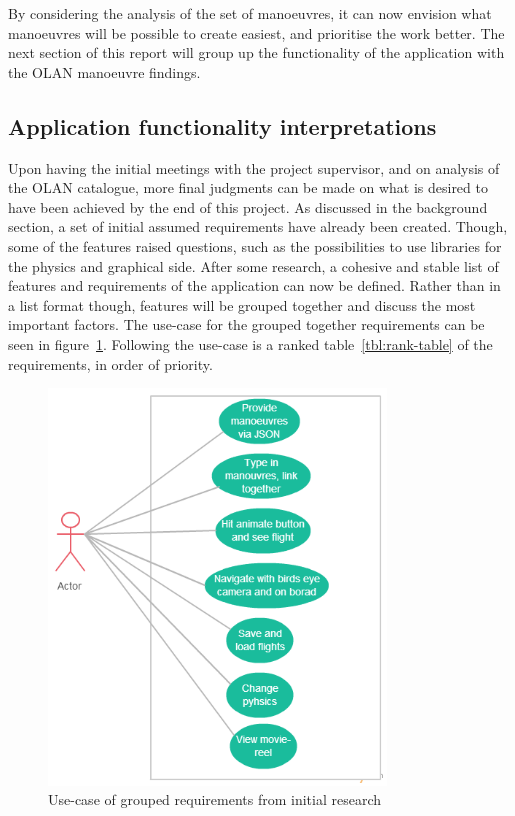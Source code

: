 By considering the analysis of the set of manoeuvres, it can now envision what manoeuvres will be possible to create easiest, and prioritise the work better. The next section of this report will group up the functionality of the application with the OLAN manoeuvre findings.

\subsection{Application functionality interpretations}
Upon having the initial meetings with the project supervisor, and on analysis of the OLAN catalogue, more final judgments can be made on what is desired to have been achieved by the end of this project. As discussed in the background section, a set of initial assumed requirements have already been created. Though, some of the features raised questions, such as the possibilities to use libraries for the physics and graphical side. After some research, a cohesive and stable list of features and requirements of the application can now be defined. Rather than in a list format though, features will be grouped together and discuss the most important factors. The use-case for the grouped together requirements can be seen in figure~\ref{fig:usereq}. Following the use-case is a ranked table~\ref{tbl:rank-table} of the requirements, in order of priority.


\begin{figure}[h!]
  \centering
      \includegraphics[width=0.8\textwidth]{images/usereq.png}
  \caption{Use-case of grouped requirements from initial research}
  \label{fig:usereq}
\end{figure}

